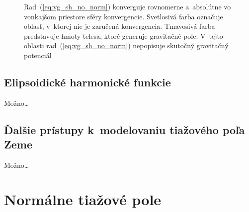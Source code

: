 \documentclass[a4paper, 12pt]{book}
\begin{document}
\begin{figure}
\centering

\caption{Rad~(\ref{eq:vg_sh_no_norm}) konverguje rovnomerne a~absolútne vo
vonkajšom priestore sféry konvergencie.  Svetlosivá farba označuje oblasť,
v~ktorej nie je zaručená konvergencia.  Tmavosivá farba predstavuje hmoty
telesa, ktoré generuje gravitačné pole.  V~tejto oblasti
rad~(\ref{eq:vg_sh_no_norm}) nepopisuje skutočný gravitačný potenciál}
\label{fig:spherical_harmonics_convergence}
\end{figure}







\section{Elipsoidické harmonické funkcie}

Možno\dots







\section{Ďalšie prístupy k~modelovaniu tiažového poľa Zeme}

Možno\dots










\chapter{Normálne tiažové pole}
\label{sec:normal_gravity_field}







\end{document}
